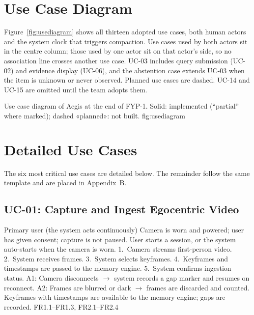 \section{Use Case Diagram}
Figure~\ref{fig:usediagram} shows all thirteen adopted use cases, both human
actors and the system clock that triggers compaction. Use cases used by both
actors sit in the centre column; those used by one actor sit on that actor's
side, so no association line crosses another use case. UC-03 includes query
submission (UC-02) and evidence display (UC-06), and the abstention case extends
UC-03 when the item is unknown or never observed. Planned use cases are dashed.
UC-14 and UC-15 are omitted until the team adopts them.

  {Use case diagram of Aegis at the end of FYP-1. Solid: implemented
   (``partial'' where marked); dashed «planned»: not built.}
  {fig:usediagram}



\section{Detailed Use Cases}
The six most critical use cases are detailed below. The remainder follow the
same template and are placed in Appendix~B.

\subsection{UC-01: Capture and Ingest Egocentric Video}
{Primary user (the system acts continuously)}
{Camera is worn and powered; user has given consent; capture is not paused.}
{User starts a session, or the system auto-starts when the camera is worn.}
{1.~Camera streams first-person video. 2.~System receives frames. 3.~System
selects keyframes. 4.~Keyframes and timestamps are passed to the memory engine.
5.~System confirms ingestion status.}
{A1: Camera disconnects $\rightarrow$ system records a gap marker and resumes
on reconnect. A2: Frames are blurred or dark $\rightarrow$ frames are discarded
and counted.}
{Keyframes with timestamps are available to the memory engine; gaps are
recorded.}
{FR1.1--FR1.3, FR2.1--FR2.4}

